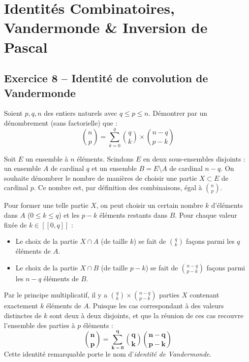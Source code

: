 \documentclass[11pt,a4paper]{article}
\begin{document}
\vspace{0.4cm}

\section{Identités Combinatoires, Vandermonde \& Inversion de Pascal}

\subsection*{Exercice 8 -- Identité de convolution de Vandermonde}

Soient $p, q, n$ des entiers naturels avec $q \le p \le n$. Démontrer par un dénombrement (sans factorielle) que :
\[
\binom{n}{p} = \sum_{k=0}^q \binom{q}{k} \times \binom{n-q}{p-k}
\]

\begin{correctionbox}
Soit $E$ un ensemble à $n$ éléments.
Scindons $E$ en deux sous-ensembles disjoints : un ensemble $A$ de cardinal $q$ et un ensemble $B = E \setminus A$ de cardinal $n - q$.
On souhaite dénombrer le nombre de manières de choisir une partie $X \subset E$ de cardinal $p$.
Ce nombre est, par définition des combinaisons, égal à $\binom{n}{p}$.

Pour former une telle partie $X$, on peut choisir un certain nombre $k$ d'éléments dans $A$ ($0 \le k \le q$) et les $p - k$ éléments restants dans $B$.
Pour chaque valeur fixée de $k \in [\![0, q]\!]$ :
\begin{itemize}[label=$\bullet$]
    \item Le choix de la partie $X \cap A$ (de taille $k$) se fait de $\binom{q}{k}$ façons parmi les $q$ éléments de $A$.
    \item Le choix de la partie $X \cap B$ (de taille $p - k$) se fait de $\binom{n-q}{p-k}$ façons parmi les $n - q$ éléments de $B$.
\end{itemize}
Par le principe multiplicatif, il y a $\binom{q}{k} \times \binom{n-q}{p-k}$ parties $X$ contenant exactement $k$ éléments de $A$.
Puisque les cas correspondant à des valeurs distinctes de $k$ sont deux à deux disjoints, et que la réunion de ces cas recouvre l'ensemble des parties à $p$ éléments :
\[
\mathbf{\binom{n}{p} = \sum_{k=0}^q \binom{q}{k} \binom{n-q}{p-k}}
\]
Cette identité remarquable porte le nom d'\emph{identité de Vandermonde}.
\end{correctionbox}
\end{document}
